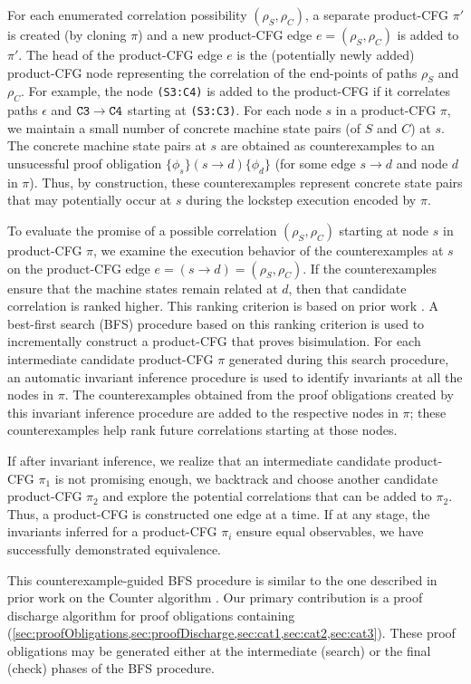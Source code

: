 For each enumerated correlation possibility $(\rho_S,\rho_C)$,
a separate
product-CFG $\pi'$ is created (by cloning $\pi$)
and a new product-CFG
edge $e=(\rho_S,\rho_C)$ is added to $\pi'$.
The head of the product-CFG edge $e$ is the
(potentially newly added) product-CFG node representing
the correlation of the end-points of paths $\rho_S$
and $\rho_C$. For example, the node {\tt (S3:C4)} is added
to the product-CFG if it correlates paths $\epsilon$ and ${\tt C3\rightarrow{}C4}$
starting at {\tt (S3:C3)}.
For each node $s$ in a product-CFG $\pi$, we maintain
a small number of
concrete machine state pairs (of $S$ and $C$) at $s$.
The concrete
machine state pairs at $s$
are obtained as
counterexamples to an unsucessful proof
obligation $\{\phi_s\} (s \rightarrow d) \{\phi_d\}$ (for
some edge $s \rightarrow d$ and node $d$ in $\pi$).
Thus, by construction, these counterexamples represent
concrete state pairs that
may potentially occur
at $s$ during the lockstep execution encoded
by $\pi$.

To evaluate the promise of a possible correlation
$(\rho_S,\rho_C)$ starting at node $s$
in product-CFG $\pi$,
we examine the execution
behavior of the counterexamples at $s$ on
the product-CFG edge $e=(s\rightarrow d)=(\rho_S,\rho_C)$.
If the counterexamples ensure that the machine
states remain
related at $d$, then that candidate correlation
is ranked higher.
This ranking criterion is based on prior work \cite{oopsla20}.
A best-first search (BFS) procedure based on this ranking
criterion is used to incrementally construct
a product-CFG that proves bisimulation.
For each intermediate candidate product-CFG $\pi$ generated
during this search procedure,
an automatic invariant inference procedure is used
to identify invariants at all the nodes in $\pi$.
The counterexamples
obtained from the proof obligations created
by this invariant inference procedure are added to the
respective nodes in $\pi$; these counterexamples
help rank future correlations starting at those
nodes.

If after invariant inference,
we realize that an intermediate candidate product-CFG $\pi_1$
is not promising enough,
we backtrack and choose another
candidate product-CFG $\pi_2$ and explore the potential correlations that
can be added to $\pi_2$.
Thus, a product-CFG is constructed one edge at a time.
If at any stage, the invariants inferred for a product-CFG
$\pi_i$ ensure equal
observables, we have successfully demonstrated equivalence.

This counterexample-guided BFS procedure
is similar to the one described in prior work on
the Counter algorithm \cite{oopsla20}. Our
primary contribution is a proof discharge
algorithm for proof obligations containing
\recursiveRelations{}
(\cref{sec:proofObligations,sec:proofDischarge,sec:cat1,sec:cat2,sec:cat3}).
These proof obligations may
be generated either at the intermediate (search) or
the final (check)
phases of the BFS procedure.

